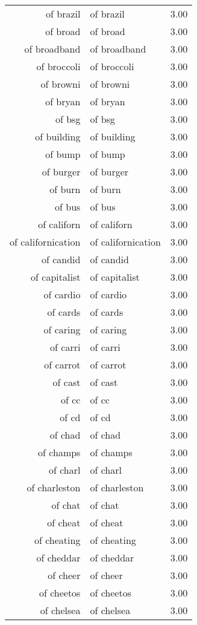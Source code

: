 \begin{table}[ht]
\begin{tabular}{rlr}
  of brazil & of brazil & 3.00 \\ 
  of broad & of broad & 3.00 \\ 
  of broadband & of broadband & 3.00 \\ 
  of broccoli & of broccoli & 3.00 \\ 
  of browni & of browni & 3.00 \\ 
  of bryan & of bryan & 3.00 \\ 
  of bsg & of bsg & 3.00 \\ 
  of building & of building & 3.00 \\ 
  of bump & of bump & 3.00 \\ 
  of burger & of burger & 3.00 \\ 
  of burn & of burn & 3.00 \\ 
  of bus & of bus & 3.00 \\ 
  of californ & of californ & 3.00 \\ 
  of californication & of californication & 3.00 \\ 
  of candid & of candid & 3.00 \\ 
  of capitalist & of capitalist & 3.00 \\ 
  of cardio & of cardio & 3.00 \\ 
  of cards & of cards & 3.00 \\ 
  of caring & of caring & 3.00 \\ 
  of carri & of carri & 3.00 \\ 
  of carrot & of carrot & 3.00 \\ 
  of cast & of cast & 3.00 \\ 
  of cc & of cc & 3.00 \\ 
  of cd & of cd & 3.00 \\ 
  of chad & of chad & 3.00 \\ 
  of champs & of champs & 3.00 \\ 
  of charl & of charl & 3.00 \\ 
  of charleston & of charleston & 3.00 \\ 
  of chat & of chat & 3.00 \\ 
  of cheat & of cheat & 3.00 \\ 
  of cheating & of cheating & 3.00 \\ 
  of cheddar & of cheddar & 3.00 \\ 
  of cheer & of cheer & 3.00 \\ 
  of cheetos & of cheetos & 3.00 \\ 
  of chelsea & of chelsea & 3.00 \\ 

\end{tabular}
\end{table}
